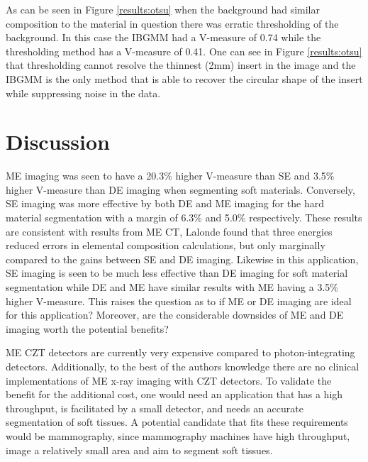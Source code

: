 \documentclass[a4paper,11pt]{article}
\begin{document}
As can be seen in Figure \ref{results:otsu} when the background had similar composition to the material in question there was erratic thresholding of the background. In this case the IBGMM had a V-measure of 0.74 while the thresholding method has a V-measure of 0.41. One can see in Figure \ref{results:otsu} that thresholding cannot resolve the thinnest (2mm) insert in the image and the IBGMM is the only method that is able to recover the circular shape of the insert while suppressing noise in the data.



\section{Discussion}

ME imaging was seen to have a 20.3\% higher V-measure than SE and 3.5\% higher V-measure than DE imaging when segmenting soft materials. Conversely, SE imaging was more effective by both DE and ME imaging for the hard material segmentation with a margin of 6.3\% and 5.0\% respectively. These results are consistent with results from ME CT, Lalonde \cite{Lalonde2016ACT} found that three energies reduced errors in elemental composition calculations, but only marginally compared to the gains between SE and DE imaging. Likewise in this application, SE imaging is seen to be much less effective than DE imaging for soft material segmentation while DE and ME have similar results with ME having a 3.5\% higher V-measure. This raises the question as to if ME or DE imaging are ideal for this application? Moreover, are the considerable downsides of ME and DE imaging worth the potential benefits?

ME CZT detectors are currently very expensive compared to photon-integrating detectors. Additionally, to the best of the authors knowledge there are no clinical implementations of ME x-ray imaging with CZT detectors. To validate the benefit for the additional cost, one would need an application that has a high throughput, is facilitated by a small detector, and needs an accurate segmentation of soft tissues. A potential candidate that fits these requirements would be mammography, since mammography machines have high throughput, image a relatively small area and aim to segment soft tissues. 
\end{document}
